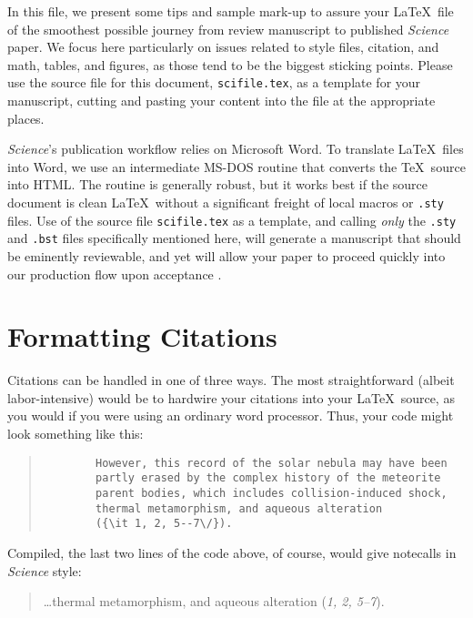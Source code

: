 \documentclass[12pt]{article}
\begin{document}
	In this file, we present some tips and sample mark-up to assure your
	\LaTeX\ file of the smoothest possible journey from review manuscript
	to published {\it Science\/} paper.  We focus here particularly on
	issues related to style files, citation, and math, tables, and
	figures, as those tend to be the biggest sticking points.  Please use
	the source file for this document, \texttt{scifile.tex}, as a template
	for your manuscript, cutting and pasting your content into the file at
	the appropriate places.
	
	{\it Science\/}'s publication workflow relies on Microsoft Word.  To
	translate \LaTeX\ files into Word, we use an intermediate MS-DOS
	routine \cite{tth} that converts the \TeX\ source into HTML\@.  The
	routine is generally robust, but it works best if the source document
	is clean \LaTeX\ without a significant freight of local macros or
	\texttt{.sty} files.  Use of the source file \texttt{scifile.tex} as a
	template, and calling {\it only\/} the \texttt{.sty} and \texttt{.bst}
	files specifically mentioned here, will generate a manuscript that
	should be eminently reviewable, and yet will allow your paper to
	proceed quickly into our production flow upon acceptance \cite{use2e}.
	
	
	\section*{Formatting Citations}
	
	Citations can be handled in one of three ways.  The most
	straightforward (albeit labor-intensive) would be to hardwire your
	citations into your \LaTeX\ source, as you would if you were using an
	ordinary word processor.  Thus, your code might look something like
	this:
	
	
	\begin{quote}
		\begin{verbatim}
		However, this record of the solar nebula may have been
		partly erased by the complex history of the meteorite
		parent bodies, which includes collision-induced shock,
		thermal metamorphism, and aqueous alteration
		({\it 1, 2, 5--7\/}).
		\end{verbatim}
	\end{quote}
	
	
	\noindent Compiled, the last two lines of the code above, of course, would give notecalls in {\it Science\/} style:
	
	\begin{quote}
		\ldots thermal metamorphism, and aqueous alteration ({\it 1, 2, 5--7\/}).
	\end{quote}
	
\end{document}
